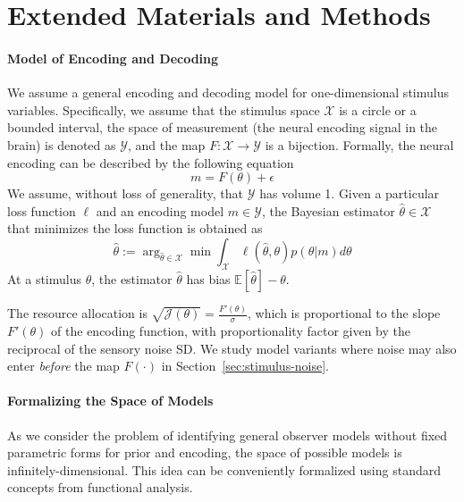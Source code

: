 

\newcommand{\correspondingSIVersion}[2]{#2}

\setcounter{section}{-1}


\section{Extended Materials and Methods}

\paragraph*{Model of Encoding and Decoding}
We assume a general encoding and decoding model for one-dimensional stimulus variables. Specifically, we assume that the stimulus space $\mathcal{X}$ is a circle or a bounded interval, the space of measurement (the neural encoding signal in the brain) is denoted as $\mathcal{Y}$, and the map $F : \mathcal{X} \rightarrow \mathcal{Y}$ is a bijection.
Formally, the neural encoding can be described by the following equation
\begin{equation*} %
    m = F(\theta) + \epsilon
\end{equation*}
We assume, without loss of generality, that $\mathcal{Y}$ has volume 1.
Given a particular loss function $\ell$ and an encoding model $m\in\mathcal{Y}$, the Bayesian  estimator $\widehat{\theta} \in \mathcal{X}$ that minimizes the loss function is obtained as 
\begin{equation*} %
	\widehat{\theta} := \arg_{\widehat\theta\in\mathcal{X}} \min \int_{\mathcal{X}}
	\ell({\widehat\theta}, \theta)
	p(\theta|m) d\theta
\end{equation*}
At a stimulus $\theta$, the estimator $\widehat{\theta}$ has bias $\mathbb{E}[\widehat{\theta}]-\theta$.

The resource allocation is $\sqrt{\mathcal{J}(\theta)} = \frac{F'(\theta)}{\sigma}$, which is proportional to the slope $F'(\theta)$ of the encoding function,  with proportionality factor given by the reciprocal of the sensory noise SD. %
We study model variants where noise may also enter \emph{before} the map $F(\cdot)$ in \correspondingSIVersion{SI Appendix S5.2}{Section~\ref{sec:stimulus-noise}}.


%

\paragraph*{Formalizing the Space of Models}
As we consider the problem of identifying general observer models without fixed parametric forms for prior and encoding, the space of possible models is infinitely-dimensional. This idea can be conveniently formalized using standard  concepts from functional analysis.

